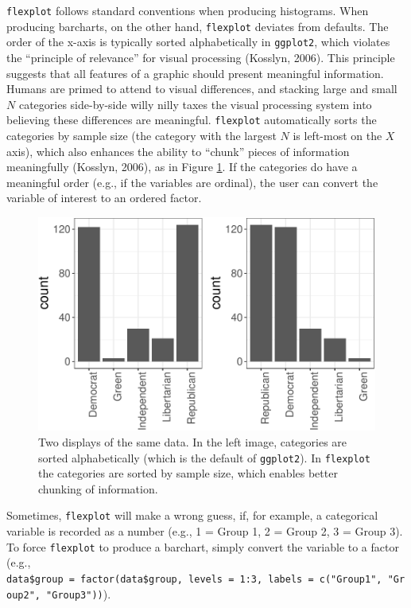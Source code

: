 \documentclass[
  man]{apa6}
\begin{document}
\normalsize

\texttt{flexplot} follows standard conventions when producing histograms. When producing barcharts, on the other hand, \texttt{flexplot} deviates from defaults. The order of the x-axis is typically sorted alphabetically in \texttt{ggplot2}, which violates the ``principle of relevance'' for visual processing (Kosslyn, 2006). This principle suggests that all features of a graphic should present meaningful information. Humans are primed to attend to visual differences, and stacking large and small \(N\) categories side-by-side willy nilly taxes the visual processing system into believing these differences are meaningful. \texttt{flexplot} automatically sorts the categories by sample size (the category with the largest \(N\) is left-most on the \(X\) axis), which also enhances the ability to ``chunk'' pieces of information meaningfully (Kosslyn, 2006), as in Figure \ref{fig:chunkit}. If the categories do have a meaningful order (e.g., if the variables are ordinal), the user can convert the variable of interest to an ordered factor.

\small

\begin{figure}
\centering
\includegraphics{flexplot_psychmeth_files/figure-latex/chunkit-1.pdf}
\caption{\label{fig:chunkit}Two displays of the same data. In the left image, categories are sorted alphabetically (which is the default of \texttt{ggplot2}). In \texttt{flexplot} the categories are sorted by sample size, which enables better chunking of information. \label{fig:chunkit}}
\end{figure}

\normalsize

Sometimes, \texttt{flexplot} will make a wrong guess, if, for example, a categorical variable is recorded as a number (e.g., 1 = Group 1, 2 = Group 2, 3 = Group 3). To force \texttt{flexplot} to produce a barchart, simply convert the variable to a factor (e.g., \texttt{data\$group\ =\ factor(data\$group,\ levels\ =\ 1:3,\ labels\ =\ c("Group1",\ "Group2",\ "Group3"))}).
\end{document}

